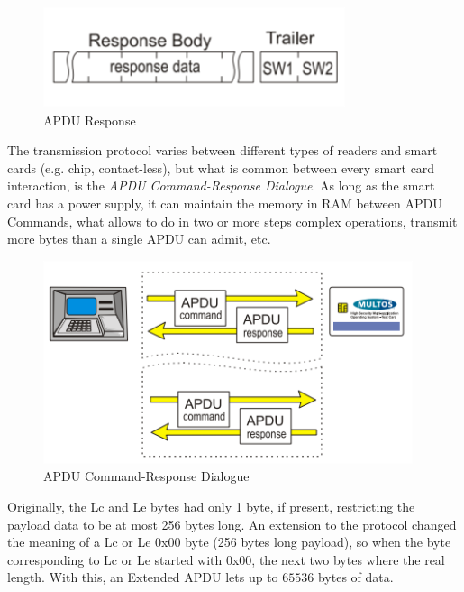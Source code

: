 \begin{figure}[bth]
	\begin{center}
		\includegraphics[width=0.55\linewidth]{gfx/APDUResponse}
	\end{center}
	\caption{APDU Response}
	\label{fig:APDUResponse}
\end{figure}




\hfil


The transmission protocol varies between different types of readers and smart cards (e.g. chip, contact-less), but what is common between every smart card interaction, is the \textit{APDU Command-Response Dialogue}. As long as the smart card has a power supply, it can maintain the memory in RAM between APDU Commands, what allows to do in two or more steps complex operations, transmit more bytes than a single APDU can admit, etc.

\hfil




\begin{figure}[bth]
	\begin{center}
		\includegraphics[width=0.75\linewidth]{gfx/APDUdialog}
	\end{center}
	\caption{APDU Command-Response Dialogue}
	\label{fig:APDUdialog}
\end{figure}

Originally, the Lc and Le bytes had only 1 byte, if present, restricting the payload data to be at most 256 bytes long. An extension to the protocol changed the meaning of a Lc or Le 0x00 byte (256 bytes long payload), so when the byte corresponding to Lc or Le started with 0x00, the next two bytes where the real length.  With this, an Extended APDU lets up to $65536$ bytes of data.

